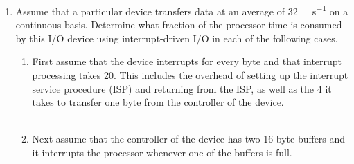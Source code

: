 \documentclass[12pt]{article}
\begin{document}

	\begin{enumerate}[itemsep=3em]
		\item{Assume that a particular device transfers data at an average of \SI{32}{\kilo\byte\per\s} on a continuous basis. Determine what fraction of the processor time is consumed by this I/O device using interrupt-driven I/O in each of the following cases.}\\	
		\begin{enumerate}[itemsep=3em]
			\item{First assume that the device interrupts for every byte and that interrupt processing takes \SI{20}{\mics}.  This includes the overhead of setting up the interrupt service procedure (ISP) and returning from the ISP, as well as the \SI{4}{\mics} it takes to transfer one byte from the controller of the device.}\\ \\
			
			\newpage
			\item{ Next assume that the controller of the device has two 16-byte buffers and it interrupts the processor whenever one of the buffers is full.}\\ \\
\end{enumerate}
\end{enumerate}
\end{document}
